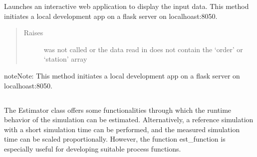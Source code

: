 \documentclass[letterpaper,10pt,english]{sphinxmanual}
\begin{document}
\begin{fulllineitems}
\begin{fulllineitems}
\label{\detokenize{source/API/api:environment.Environment.visualize}}
\sphinxAtStartPar
Launches an interactive web application to display the input data.
This method initiates a local development app on a flask server on localhoast:8050.
\begin{quote}\begin{description}
\item[{Raises}] \leavevmode
\sphinxAtStartPar
{} \textendash{}  was not called or the data read in does not contain the ‘order’ or ‘station’
array

\end{description}\end{quote}

\begin{sphinxadmonition}{note}{Note:}
\sphinxAtStartPar
This method initiates a local development app on a flask server on localhoast:8050.
\end{sphinxadmonition}

\end{fulllineitems}


\end{fulllineitems}



\subsection{}
\label{\detokenize{source/API/api:estimator}}
\sphinxAtStartPar
The Estimator class offers some functionalities through which the runtime behavior of the simulation can be estimated.
Alternatively, a reference simulation with a short simulation time can be performed, and the measured simulation time
can be scaled proportionally. However, the function est\_function is especially useful for developing suitable process
functions.

\label{\detokenize{source/API/api:module-estimator}}
\end{document}
